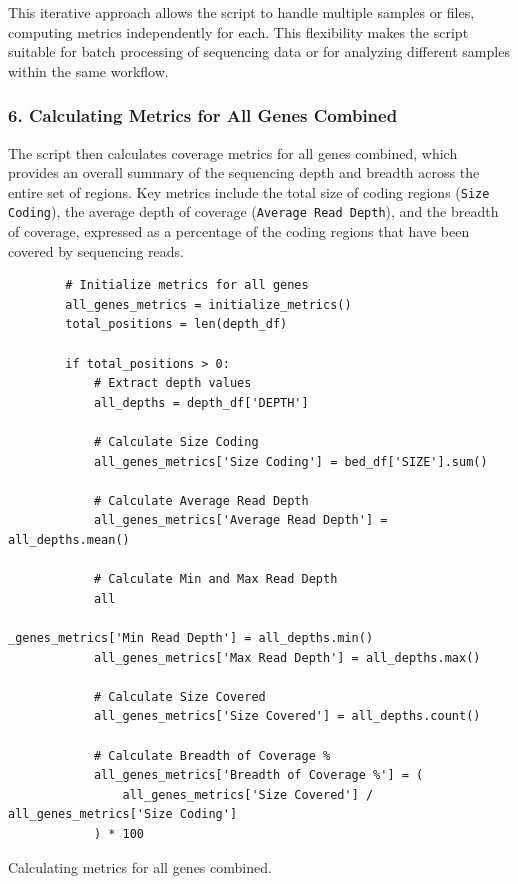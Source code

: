 This iterative approach allows the script to handle multiple samples or files, computing metrics independently for each. This flexibility makes the script suitable for batch processing of sequencing data or for analyzing different samples within the same workflow.

\subsubsection{6. Calculating Metrics for All Genes Combined}

The script then calculates coverage metrics for all genes combined, which provides an overall summary of the sequencing depth and breadth across the entire set of regions. Key metrics include the total size of coding regions (\texttt{Size Coding}), the average depth of coverage (\texttt{Average Read Depth}), and the breadth of coverage, expressed as a percentage of the coding regions that have been covered by sequencing reads.

\begin{longlisting}
\begin{verbatim}
        # Initialize metrics for all genes
        all_genes_metrics = initialize_metrics()
        total_positions = len(depth_df)

        if total_positions > 0:
            # Extract depth values
            all_depths = depth_df['DEPTH']

            # Calculate Size Coding
            all_genes_metrics['Size Coding'] = bed_df['SIZE'].sum()

            # Calculate Average Read Depth
            all_genes_metrics['Average Read Depth'] = all_depths.mean()
            
            # Calculate Min and Max Read Depth
            all

_genes_metrics['Min Read Depth'] = all_depths.min()
            all_genes_metrics['Max Read Depth'] = all_depths.max()

            # Calculate Size Covered
            all_genes_metrics['Size Covered'] = all_depths.count()

            # Calculate Breadth of Coverage %
            all_genes_metrics['Breadth of Coverage %'] = (
                all_genes_metrics['Size Covered'] / all_genes_metrics['Size Coding']
            ) * 100
\end{verbatim}
\caption{Calculating metrics for all genes combined.}
\label{lbl:metrics_all_genes}
\end{longlisting}

